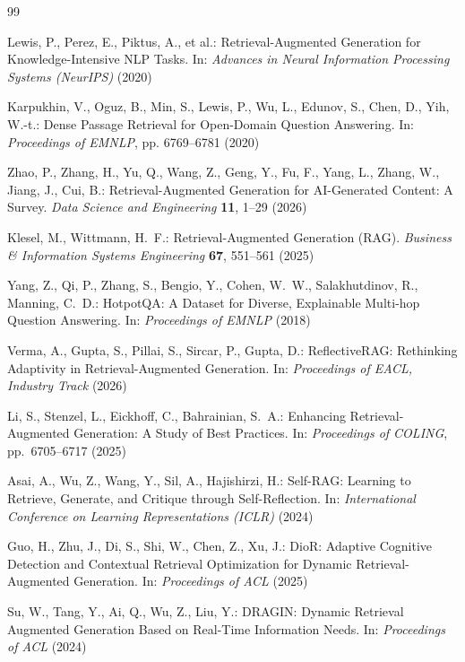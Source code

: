 \documentclass[runningheads]{llncs}
\begin{document}
\begin{thebibliography}{99}

Lewis, P., Perez, E., Piktus, A., et al.:
Retrieval-Augmented Generation for Knowledge-Intensive NLP Tasks.
In: \emph{Advances in Neural Information Processing Systems (NeurIPS)} (2020)

Karpukhin, V., Oguz, B., Min, S., Lewis, P., Wu, L., Edunov, S., Chen, D., Yih, W.-t.:
Dense Passage Retrieval for Open-Domain Question Answering.
In: \emph{Proceedings of EMNLP}, pp. 6769--6781 (2020)

Zhao, P., Zhang, H., Yu, Q., Wang, Z., Geng, Y., Fu, F., Yang, L., Zhang, W., Jiang, J., Cui, B.:
Retrieval-Augmented Generation for AI-Generated Content: A Survey.
\emph{Data Science and Engineering} \textbf{11}, 1--29 (2026)

Klesel, M., Wittmann, H.~F.:
Retrieval-Augmented Generation (RAG).
\emph{Business \& Information Systems Engineering} \textbf{67}, 551--561 (2025)

Yang, Z., Qi, P., Zhang, S., Bengio, Y., Cohen, W.~W., Salakhutdinov, R., Manning, C.~D.:
HotpotQA: A Dataset for Diverse, Explainable Multi-hop Question Answering.
In: \emph{Proceedings of EMNLP} (2018)

Verma, A., Gupta, S., Pillai, S., Sircar, P., Gupta, D.:
ReflectiveRAG: Rethinking Adaptivity in Retrieval-Augmented Generation.
In: \emph{Proceedings of EACL, Industry Track} (2026)

Li, S., Stenzel, L., Eickhoff, C., Bahrainian, S.~A.:
Enhancing Retrieval-Augmented Generation: A Study of Best Practices.
In: \emph{Proceedings of COLING}, pp.~6705--6717 (2025)

Asai, A., Wu, Z., Wang, Y., Sil, A., Hajishirzi, H.:
Self-RAG: Learning to Retrieve, Generate, and Critique through Self-Reflection.
In: \emph{International Conference on Learning Representations (ICLR)} (2024)

Guo, H., Zhu, J., Di, S., Shi, W., Chen, Z., Xu, J.:
DioR: Adaptive Cognitive Detection and Contextual Retrieval Optimization for Dynamic Retrieval-Augmented Generation.
In: \emph{Proceedings of ACL} (2025)

Su, W., Tang, Y., Ai, Q., Wu, Z., Liu, Y.:
DRAGIN: Dynamic Retrieval Augmented Generation Based on Real-Time Information Needs.
In: \emph{Proceedings of ACL} (2024)


\end{thebibliography}
\end{document}
